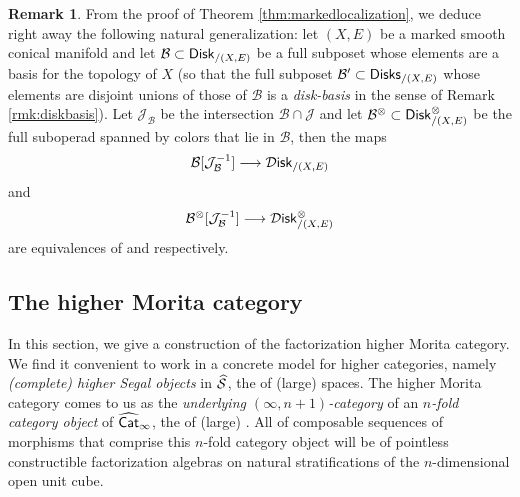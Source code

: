 \documentclass[10pt, reqno, twoside
, final
]{amsart}
\numberwithin{equation}{subsection}%
\theoremstyle{definition}
\theoremstyle{definition}
\theoremstyle{definition}
\theoremstyle{definition}
\theoremstyle{definition}
\theoremstyle{definition}
\theoremstyle{definition}
\theoremstyle{definition}
\theoremstyle{definition}
\theoremstyle{plain}
\theoremstyle{definition}
\theoremstyle{plain}
\theoremstyle{definition}
\theoremstyle{plain}
\theoremstyle{definition}
\newtheorem{rmk}[defn]{Remark}
\theoremstyle{definition}
\theoremstyle{plain}
\theoremstyle{plain}
\theoremstyle{definition}
\theoremstyle{plain}
\theoremstyle{plain}
\theoremstyle{plain}
\begin{document}
\begin{rmk}\label{rmk:basislocalization}
From the proof of Theorem \ref{thm:markedlocalization}, we deduce right away the following natural generalization: let $(X,E)$ be a marked smooth conical manifold and let $\mathcal{B}\subset \mathsf{Disk}_{/(X,E)}$ be a full subposet whose elements are a basis for the topology of $X$ (so that the full subposet $\mathcal{B}'\subset \mathsf{Disks}_{/(X,E)}$ whose elements are disjoint unions of those of $\mathcal{B}$ is a \emph{disk-basis} in the sense of Remark \ref{rmk:diskbasis}). Let $\mathcal{J}_{\mathcal{B}}$ be the intersection $\mathcal{B}\cap \mathcal{J}$ and let $\mathcal{B}^{\otimes}\subset \mathsf{Disk}_{/(X,E)}^{\otimes}$ be the full suboperad spanned by colors that lie in $\mathcal{B}$, then the maps
\[\mathcal{B}[\mathcal{J}_{\mathcal{B}}^{-1}]\longrightarrow \mathcal{D}\mathsf{isk}_{/(X,E)}  \]
and
\[\mathcal{B}^{\otimes}[\mathcal{J}_{\mathcal{B}}^{-1}]\longrightarrow \mathcal{D}\mathsf{isk}_{/(X,E)}^{\otimes} \]
are equivalences of \infcats and \infops respectively. 
\end{rmk}







\subsection{The higher Morita category}\label{sec:moritacat}

In this section, we give a construction of the factorization higher Morita category. We find it convenient to work in a concrete model for higher categories, namely \emph{(complete) higher Segal objects} in $\widehat{\mathcal{S}}$, the \infcat of (large) spaces. The higher Morita category comes to us as the \emph{underlying $(\infty,n+1)$-category} of an \emph{$n$-fold category object} of $\widehat{\mathsf{Cat}}_{\infty}$, the \infcat of (large) \infcatst. All \infcats of composable sequences of morphisms that comprise this $n$-fold category object will be \infcats of pointless constructible factorization algebras on natural stratifications of the $n$-dimensional open unit cube.
\end{document}
